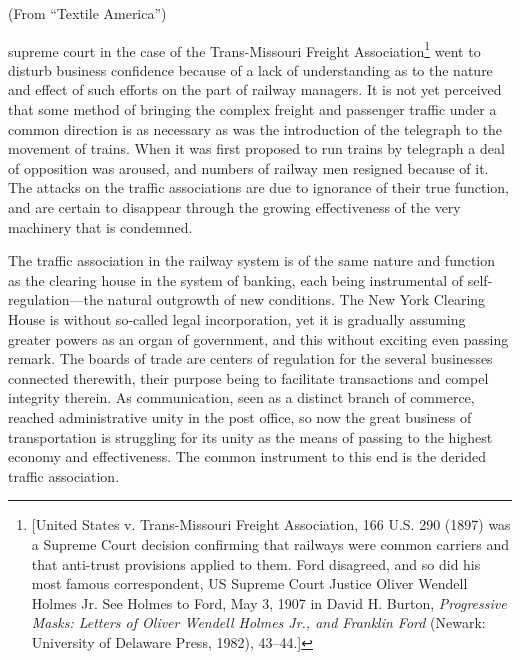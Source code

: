 \documentclass[twoside,symmetric,nobib,justified]{tufte-book}
\begin{document}
\vspace{.2in}

\begin{LARGE}


\end{LARGE}

\vspace{0.5in}



\noindent (From ``Textile America'')

 supreme court in the case of the Trans-Missouri
Freight Association\footnote{{[}United States v. Trans-Missouri Freight
  Association, 166 U.S. 290 (1897) was a Supreme Court decision
  confirming that railways were common carriers and that anti-trust
  provisions applied to them. Ford disagreed, and so did his most famous
  correspondent, US Supreme Court Justice Oliver Wendell Holmes Jr. See
  Holmes to Ford, May 3, 1907 in David H. Burton, \emph{Progressive
  Masks: Letters of Oliver Wendell Holmes Jr., and Franklin Ford}
  (Newark: University of Delaware Press, 1982), 43--44.{]}} went to
disturb business confidence because of a lack of understanding as to the
nature and effect of such efforts on the part of railway managers. It is
not yet perceived that some method of bringing the complex freight and
passenger traffic under a common direction is as necessary as was the
introduction of the telegraph to the movement of trains. When it was
first proposed to run trains by telegraph a deal of opposition was
aroused, and numbers of railway men resigned because of it. The attacks
on the traffic associations are due to ignorance of their true function,
and are certain to disappear through the growing effectiveness of the
very machinery that is condemned.

The traffic association in the railway system is of the same nature and
function as the clearing house in the system of banking, each being
instrumental of self-regulation---the natural outgrowth of new
conditions. The New York Clearing House is without so-called legal
incorporation, yet it is gradually assuming greater powers as an organ
of government, and this without exciting even passing remark. The boards
of trade are centers of regulation for the several businesses connected
therewith, their purpose being to facilitate transactions and compel
integrity therein. As communication, seen as a distinct branch of
commerce, reached administrative unity in the post office, so now the
great business of transportation is struggling for its unity as the
means of passing to the highest economy and effectiveness. The common
instrument to this end is the derided traffic association.
\end{document}
